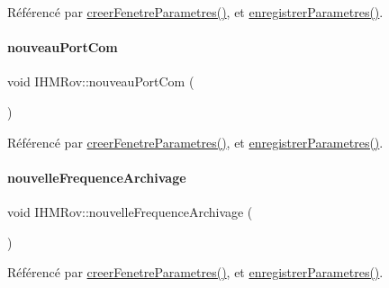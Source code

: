 Référencé par \hyperlink{class_i_h_m_rov_aed451139ac09ef18b7c92637761d80ce}{creer\+Fenetre\+Parametres()}, et \hyperlink{class_i_h_m_rov_a94d31f4e748f3e4549eab42c8bc7e367}{enregistrer\+Parametres()}.

\mbox{\label{class_i_h_m_rov_ae64280b18ebe069c1f64bd5f19ef3a2e}} 
\paragraph{\texorpdfstring{nouveau\+Port\+Com}{nouveauPortCom}}
{\footnotesize\ttfamily void I\+H\+M\+Rov\+::nouveau\+Port\+Com (\begin{DoxyParamCaption}\item[{Q\+String}]{ }\end{DoxyParamCaption})\hspace{0.3cm}{\ttfamily [signal]}}



Référencé par \hyperlink{class_i_h_m_rov_aed451139ac09ef18b7c92637761d80ce}{creer\+Fenetre\+Parametres()}, et \hyperlink{class_i_h_m_rov_a94d31f4e748f3e4549eab42c8bc7e367}{enregistrer\+Parametres()}.

\mbox{\label{class_i_h_m_rov_afcfb7f60c126fbaa87cb3f501189cc39}} 
\paragraph{\texorpdfstring{nouvelle\+Frequence\+Archivage}{nouvelleFrequenceArchivage}}
{\footnotesize\ttfamily void I\+H\+M\+Rov\+::nouvelle\+Frequence\+Archivage (\begin{DoxyParamCaption}\item[{int}]{ }\end{DoxyParamCaption})\hspace{0.3cm}{\ttfamily [signal]}}



Référencé par \hyperlink{class_i_h_m_rov_aed451139ac09ef18b7c92637761d80ce}{creer\+Fenetre\+Parametres()}, et \hyperlink{class_i_h_m_rov_a94d31f4e748f3e4549eab42c8bc7e367}{enregistrer\+Parametres()}.

